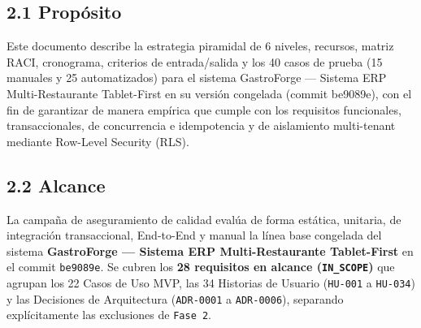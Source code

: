 \documentclass[10pt,a4paper]{article}
\begin{document}

\subsection{2.1 Propósito}\label{21-propuxf3sito}

Este documento describe la estrategia piramidal de 6 niveles, recursos, matriz RACI, cronograma, criterios de entrada/salida y los 40 casos de prueba (15 manuales y 25 automatizados) para el sistema GastroForge --- Sistema ERP Multi-Restaurante Tablet-First en su versión congelada (commit be9089e), con el fin de garantizar de manera empírica que cumple con los requisitos funcionales, transaccionales, de concurrencia e idempotencia y de aislamiento multi-tenant mediante Row-Level Security (RLS).


\subsection{2.2 Alcance}\label{22-alcance}

La campaña de aseguramiento de calidad evalúa de forma estática, unitaria, de integración transaccional, End-to-End y manual la línea base congelada del sistema \textbf{GastroForge --- Sistema ERP Multi-Restaurante Tablet-First} en el commit \texttt{be9089e}. Se cubren los \textbf{28 requisitos en alcance (\texttt{IN\_\allowbreak{}SCOPE})} que agrupan los 22 Casos de Uso MVP, las 34 Historias de Usuario (\texttt{HU-{}\allowbreak{}001} a \texttt{HU-{}\allowbreak{}034}) y las Decisiones de Arquitectura (\texttt{ADR-{}\allowbreak{}0001} a \texttt{ADR-{}\allowbreak{}0006}), separando explícitamente las exclusiones de \texttt{Fase 2}.

\begingroup\singlespacing\footnotesize\setlength{\parskip}{0pt}
\end{document}
